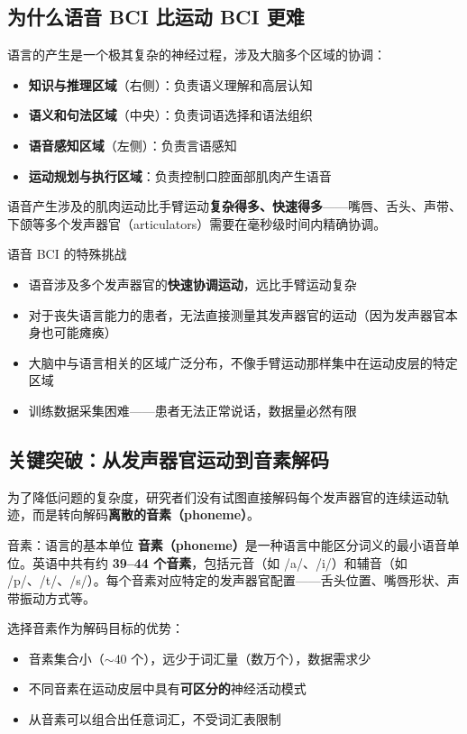 \documentclass[a4paper]{article}
\begin{document}
\subsection{为什么语音 BCI 比运动 BCI 更难}

语言的产生是一个极其复杂的神经过程，涉及大脑多个区域的协调：

\begin{itemize}
    \item \textbf{知识与推理区域}（右侧）：负责语义理解和高层认知
    \item \textbf{语义和句法区域}（中央）：负责词语选择和语法组织
    \item \textbf{语音感知区域}（左侧）：负责言语感知
    \item \textbf{运动规划与执行区域}：负责控制口腔面部肌肉产生语音
\end{itemize}

语音产生涉及的肌肉运动比手臂运动\textbf{复杂得多、快速得多}——嘴唇、舌头、声带、下颌等多个发声器官（articulators）需要在毫秒级时间内精确协调。

\begin{warningbox}{语音 BCI 的特殊挑战}
\begin{itemize}
    \item 语音涉及多个发声器官的\textbf{快速协调运动}，远比手臂运动复杂
    \item 对于丧失语言能力的患者，无法直接测量其发声器官的运动（因为发声器官本身也可能瘫痪）
    \item 大脑中与语言相关的区域广泛分布，不像手臂运动那样集中在运动皮层的特定区域
    \item 训练数据采集困难——患者无法正常说话，数据量必然有限
\end{itemize}
\end{warningbox}

\subsection{关键突破：从发声器官运动到音素解码}

为了降低问题的复杂度，研究者们没有试图直接解码每个发声器官的连续运动轨迹，而是转向解码\textbf{离散的音素（phoneme）}。

\begin{knowledgebox}{音素：语言的基本单位}
\textbf{音素（phoneme）}是一种语言中能区分词义的最小语音单位。英语中共有约 \textbf{39--44 个音素}，包括元音（如 /a/、/i/）和辅音（如 /p/、/t/、/s/）。每个音素对应特定的发声器官配置——舌头位置、嘴唇形状、声带振动方式等。

选择音素作为解码目标的优势：
\begin{itemize}
    \item 音素集合小（$\sim$40 个），远少于词汇量（数万个），数据需求少
    \item 不同音素在运动皮层中具有\textbf{可区分的}神经活动模式
    \item 从音素可以组合出任意词汇，不受词汇表限制
\end{itemize}
\end{knowledgebox}
\end{document}

